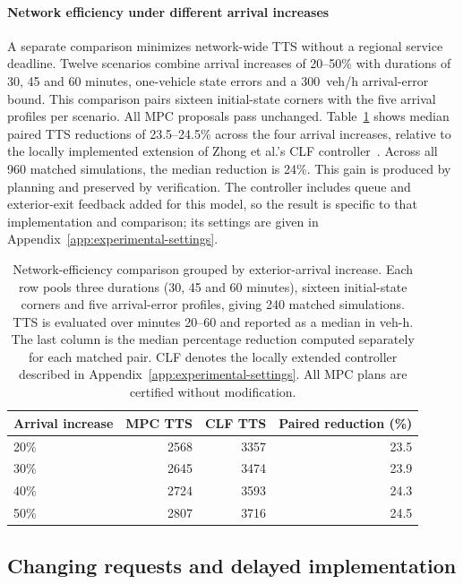 \documentclass[final]{cas-sc}
\theoremstyle{definition}
\theoremstyle{plain}
\theoremstyle{definition}
\theoremstyle{plain}
\newcommand{\appref}[1]{Appendix~\ref{#1}}
\begin{document}
\paragraph{Network efficiency under different arrival increases}
\label{sec:network-efficiency-comparison}
A separate comparison minimizes network-wide TTS without a regional
service deadline. Twelve scenarios combine arrival increases of
20--50\% with durations of 30, 45 and 60 minutes, one-vehicle state
errors and a 300~veh/h arrival-error bound. This comparison pairs
sixteen initial-state corners with the five arrival profiles per scenario.
All MPC proposals pass unchanged. Table~\ref{tab:arrival-efficiency}
shows median paired TTS reductions of 23.5--24.5\% across the four arrival
increases, relative to the locally implemented extension of Zhong
et al.'s CLF controller~\cite{zhong2018robust}. Across all 960 matched
simulations, the median reduction is 24\%. This gain is produced by
planning and preserved by verification. The controller includes
queue and exterior-exit feedback added for this model, so the result
is specific to that implementation and comparison; its settings are
given in \appref{app:experimental-settings}.

\begin{table}[pos=!htb]
\centering\small
\caption{Network-efficiency comparison grouped by exterior-arrival
increase. Each row pools three durations (30, 45 and 60 minutes),
sixteen initial-state corners and five arrival-error profiles, giving
240 matched simulations. TTS is evaluated over minutes 20--60 and
reported as a median in veh-h. The last column is the median percentage
reduction computed separately for each matched pair. CLF denotes the
locally extended controller described in Appendix~\ref{app:experimental-settings}.
All MPC plans are certified without modification.}
\label{tab:arrival-efficiency}
\begin{tabularx}{\linewidth}{@{}Xrrr@{}}
\toprule
Arrival increase & MPC TTS & CLF TTS & Paired reduction (\%)\\
\midrule
20\% & 2568 & 3357 & 23.5\\
30\% & 2645 & 3474 & 23.9\\
40\% & 2724 & 3593 & 24.3\\
50\% & 2807 & 3716 & 24.5\\
\bottomrule
\end{tabularx}
\end{table}

\subsection{Changing requests and delayed implementation}
\label{sec:sequential-handover-results}
\end{document}
